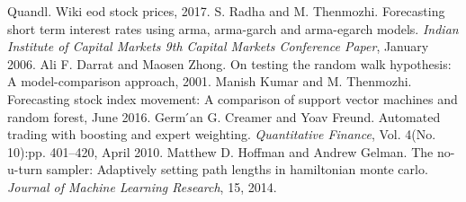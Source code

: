 \documentclass[times]{jtitauth}
\begin{document}
\begin{thebibliography}{99}

Quandl. Wiki eod stock prices, 2017.
S. Radha and M. Thenmozhi. Forecasting short term interest rates using arma, arma-garch and arma-egarch models. {\it Indian Institute of Capital Markets 9th Capital Markets Conference Paper}, January 2006.
Ali F. Darrat and Maosen Zhong. On testing the random walk hypothesis: A model-comparison approach, 2001.
Manish Kumar and M. Thenmozhi. Forecasting stock index movement: A comparison of support vector machines and random forest, June 2016.
Germ ́an G. Creamer and Yoav Freund. Automated trading with boosting and expert weighting. {\it Quantitative Finance}, Vol. 4(No. 10):pp. 401–420, April 2010.
Matthew D. Hoffman and Andrew Gelman. The no-u-turn sampler: Adaptively setting path lengths in hamiltonian monte carlo. {\it Journal of Machine Learning Research}, 15, 2014.
\end{thebibliography}
\end{document}
